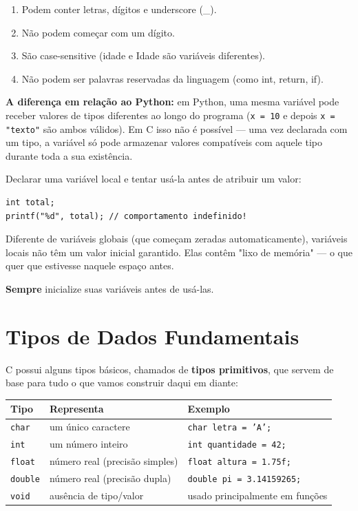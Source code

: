 \documentclass[12pt,a4paper,oneside]{extreport}
\begin{document}
\begin{enumerate}
    \item Podem conter letras, dígitos e underscore (\_).
    \item Não podem começar com um dígito.
    \item São case-sensitive (idade e Idade são variáveis diferentes).
    \item Não podem ser palavras reservadas da linguagem (como int, return, if).
\end{enumerate}

\textbf{A diferença em relação ao Python:} 
em Python, uma mesma variável pode receber valores de tipos diferentes ao longo do programa (\texttt{x = 10} e depois \texttt{x = "texto"} são ambos válidos). Em C isso não é possível — uma vez declarada com um tipo, a variável só pode armazenar valores compatíveis com aquele tipo durante toda a sua existência.


\begin{errocomum}

Declarar uma variável local e tentar usá-la antes de atribuir um valor:

\begin{lstlisting}
int total;
printf("%d", total); // comportamento indefinido!

\end{lstlisting}

Diferente de variáveis globais (que começam zeradas automaticamente), variáveis locais não têm um valor inicial garantido. Elas contêm "lixo de memória" — o que quer que estivesse naquele espaço antes. 

\textbf{Sempre} inicialize suas variáveis antes de usá-las.

    
\end{errocomum}



\section{Tipos de Dados Fundamentais}
C possui alguns tipos básicos, chamados de \textbf{tipos primitivos}, que servem de base para tudo o que vamos construir daqui em diante:

\begin{center}
\begin{tabular}{|l|l|l|}
\hline
\textbf{Tipo} & \textbf{Representa} & \textbf{Exemplo} \\
\hline
\texttt{char} & um único caractere & \texttt{char letra = 'A';} \\
\hline
\texttt{int} & um número inteiro & \texttt{int quantidade = 42;} \\
\hline
\texttt{float} & número real (precisão simples) & \texttt{float altura = 1.75f;} \\
\hline
\texttt{double} & número real (precisão dupla) & \texttt{double pi = 3.14159265;} \\
\hline
\texttt{void} & ausência de tipo/valor & usado principalmente em funções \\
\hline
\end{tabular}
\end{center}
\end{document}
